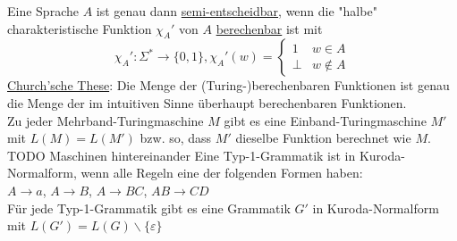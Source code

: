 \documentclass[a4paper]{article}
\newcommand{\ul}{\underline}
\let\epsilon\varepsilon
\begin{document}
Eine Sprache $A$ ist genau dann \ul{semi-entscheidbar}, wenn die "halbe" charakteristische Funktion $\chi_A'$ von $A$ \ul{berechenbar} ist mit $$\chi_A':\Sigma^*\rightarrow\{0,1\}, \chi_A'(w)=\begin{cases}
1 & w\in A\\
\bot & w\notin A
\end{cases}$$
\ul{Church'sche These}: Die Menge der (Turing-)berechenbaren Funktionen ist genau die Menge der im intuitiven Sinne überhaupt berechenbaren Funktionen.\\
Zu jeder Mehrband-Turingmaschine $M$ gibt es eine Einband-Turingmaschine $M'$ mit $L(M)=L(M')$ bzw. so, dass $M'$ dieselbe Funktion berechnet wie $M$.\\
TODO Maschinen hintereinander
Eine Typ-1-Grammatik ist in Kuroda-Normalform, wenn alle Regeln eine der folgenden Formen haben:\\
$A\rightarrow a$, $A\rightarrow B$, $A\rightarrow BC$, $AB\rightarrow CD$\\
Für jede Typ-1-Grammatik gibt es eine Grammatik $G'$ in Kuroda-Normalform mit $L(G')=L(G)\backslash\{\epsilon\}$\\
\end{document}

